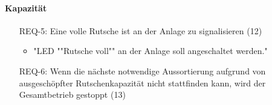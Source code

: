 \paragraph{Kapazität}
\begin{itemize}
    \item[REQ-5:] Eine volle Rutsche ist an der Anlage zu signalisieren (12)
    \begin{itemize}
        \item "LED ""Rutsche voll"" an der Anlage soll angeschaltet werden."
    \end{itemize}
    \item[REQ-6:] Wenn die nächste notwendige Aussortierung aufgrund von ausgeschöpfter Rutschenkapazität
    nicht stattfinden kann, wird der Gesamtbetrieb gestoppt (13)
\end{itemize}

